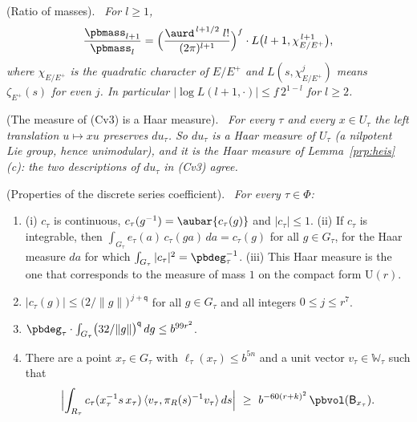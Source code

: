 \documentclass[10pt]{amsart}
\theoremstyle{definition}
\theoremstyle{remark}
\providecommand{\auPl}{\Phi}
\providecommand{\auU}{\mathrm U}
\providecommand{\pbW}{\mathbb W}
\providecommand{\pbeB}{\mathsf B}
\providecommand{\pbel}{\ell}
\providecommand{\pbeq}{\mathsf q}
\providecommand{\pbip}[2]{\langle#1,#2\rangle}
\newenvironment{quotedthm}[2]{\par\medskip\noindent\begingroup
  \textbf{#1}#2.\ \itshape\ignorespaces}{\endgroup\par\medskip}
\begin{document}
\begin{quotedthm}{\cite[Lemma~2.21]{P51}}{ (Ratio of masses)}
For $l\ge1$,
\[
\frac{\pbmass_{l+1}}{\pbmass_l}=\Bigl(\frac{\aurd^{\,l+1/2}\;l!}{(2\pi)^{l+1}}\Bigr)^{f}\cdot L\bigl(
l+1,\chi_{E/E^+}^{\,l+1}\bigr),
\]
where $\chi_{E/E^+}$ is the quadratic character of $E/E^+$ and $L(s,\chi^j_{E/E^+})$ means
$\zeta_{E^+}(s)$ for even $j$. In particular $\bigl|\log L(l+1,\cdot)\bigr|\le f\,2^{1-l}$ for
$l\ge2$.
\end{quotedthm}

\begin{quotedthm}{\cite[Lemma~3.6]{P51}}{ (The measure of \textup{(Cv3)} is a Haar measure)}
For every $\tau$ and every $x\in U_\tau$ the left translation $u\mapsto xu$ preserves $du_\tau$. So $du_\tau$
is a Haar measure of $U_\tau$ (a nilpotent Lie group, hence unimodular), and it is the Haar measure of
Lemma~\ref{prp:heis}\,\textup{(c)}: the two descriptions of $du_\tau$ in \textup{(Cv3)} agree.
\end{quotedthm}

\begin{quotedthm}{\cite[Theorem~3.16]{P51}}{ (Properties of the discrete series coefficient)}
For every $\tau\in\auPl$:
\begin{enumerate}
\item[(DS1)] \textup{(i)} $c_\tau$ is continuous, $c_\tau(g^{-1})=\aubar{c_\tau(g)}$ and $|c_\tau|
\le1$. \textup{(ii)} If $c_\tau$ is integrable, then $\int_{G_\tau}e_\tau(a)\,c_\tau(ga)\,da=c_\tau(g)$
for all $g\in G_\tau$, for the Haar measure $da$ for which $\int_{G_\tau}|c_\tau|^2=\pbdeg_\tau^{-1}$.
\textup{(iii)} This Haar measure is the one that corresponds to the measure of mass $1$ on the
compact form $\auU(r)$.
\item[(DS2)] $|c_\tau(g)|\le\bigl(2/\|g\|\bigr)^{\,j+\pbeq}$ for all $g\in G_\tau$ and all integers
$0\le j\le r^7$.
\item[(DS3)] $\pbdeg_\tau\cdot\int_{G_\tau}\bigl(32/\|g\|\bigr)^{\pbeq}\,dg\le b^{99r^2}$.
\item[(DS4)] There are a point $x_\tau\in G_\tau$ with $\pbel_\tau(x_\tau)\le b^{5n}$ and a unit
vector $v_\tau\in\pbW_\tau$ such that
\[
\Bigl|\int_{R_\tau}c_\tau(x_\tau^{-1}s\,x_\tau)\,\pbip{v_\tau}{\pi_R(s)^{-1}v_\tau}\,ds\Bigr|\ \ge\
b^{-60(r+k)^2}\,\pbvol(\pbeB_{x_\tau}).
\]
\end{enumerate}
\end{quotedthm}
\end{document}
